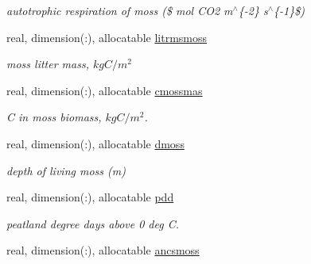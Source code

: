 \begin{DoxyCompactItemize}
\begin{DoxyCompactList}\small\item\em autotrophic respiration of moss (\$ mol C\+O2 m$^\wedge$\{-\/2\} s$^\wedge$\{-\/1\}\$) \end{DoxyCompactList}\item 
\hypertarget{structctem__statevars_1_1veg__gat_a8875c81026660b9dd172037bf09c9d88}{}real, dimension(\+:), allocatable \hyperlink{structctem__statevars_1_1veg__gat_a8875c81026660b9dd172037bf09c9d88}{litrmsmoss}\label{structctem__statevars_1_1veg__gat_a8875c81026660b9dd172037bf09c9d88}

\begin{DoxyCompactList}\small\item\em moss litter mass, $kg C/m^2$ \end{DoxyCompactList}\item 
\hypertarget{structctem__statevars_1_1veg__gat_a7520bff40a0b797b63e8b56405a7571a}{}real, dimension(\+:), allocatable \hyperlink{structctem__statevars_1_1veg__gat_a7520bff40a0b797b63e8b56405a7571a}{cmossmas}\label{structctem__statevars_1_1veg__gat_a7520bff40a0b797b63e8b56405a7571a}

\begin{DoxyCompactList}\small\item\em C in moss biomass, $kg C/m^2$. \end{DoxyCompactList}\item 
\hypertarget{structctem__statevars_1_1veg__gat_a05858c9032f521bdebc866c7e0bea762}{}real, dimension(\+:), allocatable \hyperlink{structctem__statevars_1_1veg__gat_a05858c9032f521bdebc866c7e0bea762}{dmoss}\label{structctem__statevars_1_1veg__gat_a05858c9032f521bdebc866c7e0bea762}

\begin{DoxyCompactList}\small\item\em depth of living moss (m) \end{DoxyCompactList}\item 
\hypertarget{structctem__statevars_1_1veg__gat_ac0b72784571732ded0e933429f556ffe}{}real, dimension(\+:), allocatable \hyperlink{structctem__statevars_1_1veg__gat_ac0b72784571732ded0e933429f556ffe}{pdd}\label{structctem__statevars_1_1veg__gat_ac0b72784571732ded0e933429f556ffe}

\begin{DoxyCompactList}\small\item\em peatland degree days above 0 deg C. \end{DoxyCompactList}\item 
\hypertarget{structctem__statevars_1_1veg__gat_a544cb35279f72e9609d283396e716a18}{}real, dimension(\+:), allocatable \hyperlink{structctem__statevars_1_1veg__gat_a544cb35279f72e9609d283396e716a18}{ancsmoss}\label{structctem__statevars_1_1veg__gat_a544cb35279f72e9609d283396e716a18}


\end{DoxyCompactItemize}
